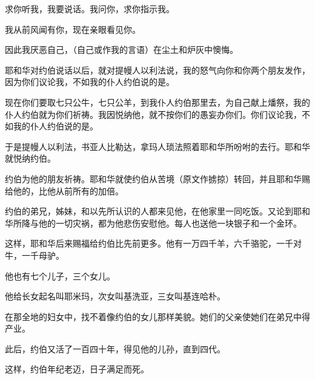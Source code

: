 \documentclass[12pt,oneside]{book}
\begin{document}
求你听我，我要说话。我问你，求你指示我。

我从前风闻有你，现在亲眼看见你。

因此我厌恶自己，（自己或作我的言语）在尘土和炉灰中懊悔。

耶和华对约伯说话以后，就对提幔人以利法说，我的怒气向你和你两个朋友发作，因为你们议论我，不如我的仆人约伯说的是。

现在你们要取七只公牛，七只公羊，到我仆人约伯那里去，为自己献上燔祭，我的仆人约伯就为你们祈祷。我因悦纳他，就不按你们的愚妄办你们。你们议论我，不如我的仆人约伯说的是。

于是提幔人以利法，书亚人比勒达，拿玛人琐法照着耶和华所吩咐的去行。耶和华就悦纳约伯。

约伯为他的朋友祈祷。耶和华就使约伯从苦境（原文作掳掠）转回，并且耶和华赐给他的，比他从前所有的加倍。

约伯的弟兄，姊妹，和以先所认识的人都来见他，在他家里一同吃饭。又论到耶和华所降与他的一切灾祸，都为他悲伤安慰他。每人也送他一块银子和一个金环。

这样，耶和华后来赐福给约伯比先前更多。他有一万四千羊，六千骆驼，一千对牛，一千母驴。

他也有七个儿子，三个女儿。

他给长女起名叫耶米玛，次女叫基洗亚，三女叫基连哈朴。

在那全地的妇女中，找不着像约伯的女儿那样美貌。她们的父亲使她们在弟兄中得产业。

此后，约伯又活了一百四十年，得见他的儿孙，直到四代。

这样，约伯年纪老迈，日子满足而死。
\end{document}
